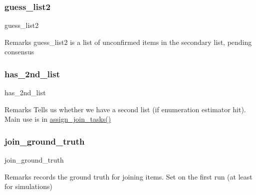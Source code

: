 \mbox{\label{classdynamicfilterapp_1_1models_1_1_join_ad05a435e0123cee2d630f3a6f253deba}} 
\subsubsection{\texorpdfstring{guess\_list2}{guess\_list2}}
{\footnotesize\ttfamily guess\+\_\+list2}

\begin{DoxyRemark}{Remarks}
guess\+\_\+list2 is a list of unconfirmed items in the secondary list, pending consensus 
\end{DoxyRemark}
\mbox{\label{classdynamicfilterapp_1_1models_1_1_join_abee8b19cb56f38f5834e09e82ec9757b}} 
\subsubsection{\texorpdfstring{has\_2nd\_list}{has\_2nd\_list}}
{\footnotesize\ttfamily has\+\_\+2nd\+\_\+list}

\begin{DoxyRemark}{Remarks}
Tells us whether we have a second list (if enumeration estimator hit). Main use is in \mbox{\hyperlink{classdynamicfilterapp_1_1models_1_1_join_ad567a4773f2c57ad19df7e88ba5dc774}{assign\+\_\+join\+\_\+tasks()}} 
\end{DoxyRemark}
\mbox{\label{classdynamicfilterapp_1_1models_1_1_join_a9bf599bb9db1e1a1e07cebc7424a15a7}} 
\subsubsection{\texorpdfstring{join\_ground\_truth}{join\_ground\_truth}}
{\footnotesize\ttfamily join\+\_\+ground\+\_\+truth}

\begin{DoxyRemark}{Remarks}
records the ground truth for joining items. Set on the first run (at least for simulations) 
\end{DoxyRemark}
\mbox{\label{classdynamicfilterapp_1_1models_1_1_join_a4eec4870d690cac806ee9a954e8d793c}} 

